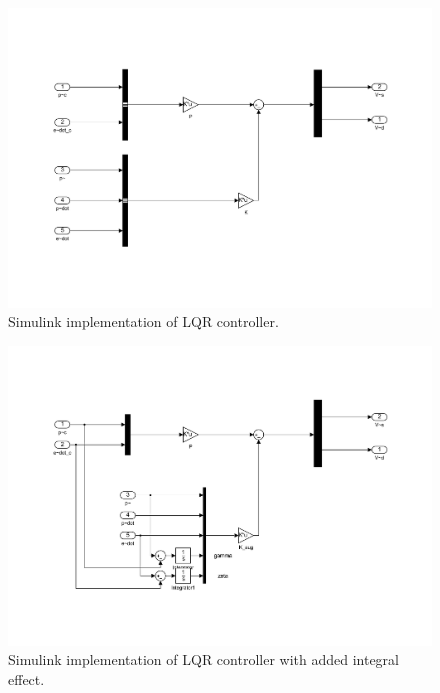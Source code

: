\begin{figure}[!htb]
	\centering
	\includegraphics[trim=0 100 0 125, clip, width=\textwidth]{simulink/P3p2_LQR_reg.pdf}
	\caption{Simulink implementation of LQR controller.}
\label{fig:LQR}
\end{figure}

\begin{figure}[!htb]
	\centering
	\includegraphics[trim=0 100 0 100, clip, width=\textwidth]{simulink/P3p3_LQR_reg_integral.pdf}
	\caption{Simulink implementation of LQR controller with added integral effect.}
\label{fig:LQRIntegral}
\end{figure}

